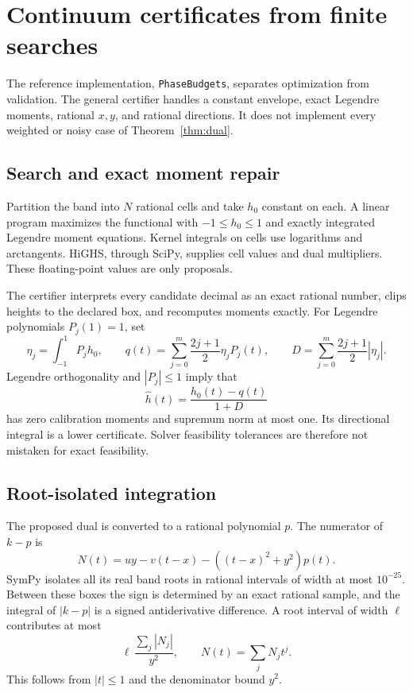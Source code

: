 \documentclass[11pt]{article}
\theoremstyle{remark}\newtheorem{remark}[theorem]{Remark}
\begin{document}
\section{Continuum certificates from finite searches}\label{sec:certificates}
The reference implementation, \texttt{PhaseBudgets}, separates optimization
from validation. The general certifier handles a constant envelope, exact
Legendre moments, rational $x,y$, and rational directions. It does not implement
every weighted or noisy case of Theorem~\ref{thm:dual}.

\subsection{Search and exact moment repair}
Partition the band into $N$ rational cells and take $h_0$ constant on each.
A linear program maximizes the functional with $-1\leq h_0\leq1$
and exactly integrated Legendre moment equations.
Kernel integrals on cells use logarithms and arctangents.
HiGHS, through SciPy, supplies cell values and dual multipliers.
These floating-point values are only proposals.

The certifier interprets every candidate decimal as an exact rational number,
clips heights to the declared box, and recomputes moments exactly.
For Legendre polynomials $P_j(1)=1$, set
\[
 \eta_j=\int_{-1}^{1}P_jh_0,\qquad
 q(t)=\sum_{j=0}^m\frac{2j+1}{2}\eta_jP_j(t),\qquad
 D=\sum_{j=0}^m\frac{2j+1}{2}|\eta_j|.
\]
Legendre orthogonality and $|P_j|\leq1$ imply that
\begin{equation}\label{eq:repair}
 \widehat h(t)=\frac{h_0(t)-q(t)}{1+D}
\end{equation}
has zero calibration moments and supremum norm at most one.
Its directional integral is a lower certificate.
Solver feasibility tolerances are therefore not mistaken for exact feasibility.

\subsection{Root-isolated integration}
The proposed dual is converted to a rational polynomial $p$.
The numerator of $k-p$ is
\[
 N(t)=uy-v(t-x)-((t-x)^2+y^2)p(t).
\]
SymPy isolates all its real band roots in rational intervals of width at most
$10^{-25}$. Between these boxes the sign is determined by an exact rational
sample, and the integral of $|k-p|$ is a signed antiderivative difference.
A root interval of width $\ell$ contributes at most
\[
 \ell\,\frac{\sum_j|N_j|}{y^2},\qquad N(t)=\sum_jN_jt^j.
\]
This follows from $|t|\leq1$ and the denominator bound $y^2$.
\end{document}
